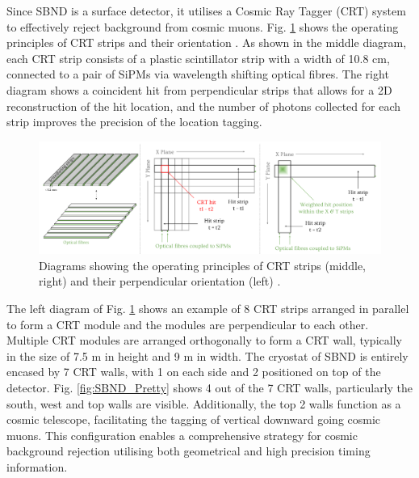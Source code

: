 Since SBND is a surface detector, it utilises a Cosmic Ray Tagger (CRT) system to effectively reject background from cosmic muons.
Fig. \ref{fig:SBND_CRT} shows the operating principles of CRT strips and their orientation \cite{RhiannonPhD}.
As shown in the middle diagram, each CRT strip consists of a plastic scintillator strip with a width of 10.8 cm, connected to a pair of SiPMs via wavelength shifting optical fibres.       
The right diagram shows a coincident hit from perpendicular strips that allows for a 2D reconstruction of the hit location, and the number of photons collected for each strip improves the precision of the location tagging.
\begin{figure}[b!] 
\centering    
\includegraphics[width=1.0\textwidth]{SBND_CRT}
\caption[Cosmic Ray Tagger Diagrams]{
Diagrams showing the operating principles of CRT strips (middle, right) and their perpendicular orientation (left) \cite{RhiannonPhD}.
}
\label{fig:SBND_CRT}
\end{figure}

The left diagram of Fig. \ref{fig:SBND_CRT} shows an example of 8 CRT strips arranged in parallel to form a CRT module and the modules are perpendicular to each other.
Multiple CRT modules are arranged orthogonally to form a CRT wall, typically in the size of 7.5 m in height and 9 m in width.
The cryostat of SBND is entirely encased by 7 CRT walls, with 1 on each side and 2 positioned on top of the detector.
Fig. \ref{fig:SBND_Pretty} shows 4 out of the 7 CRT walls, particularly the south, west and top walls are visible.
Additionally, the top 2 walls function as a cosmic telescope, facilitating the tagging of vertical downward going cosmic muons.
This configuration enables a comprehensive strategy for cosmic background rejection utilising both geometrical and high precision timing information.

